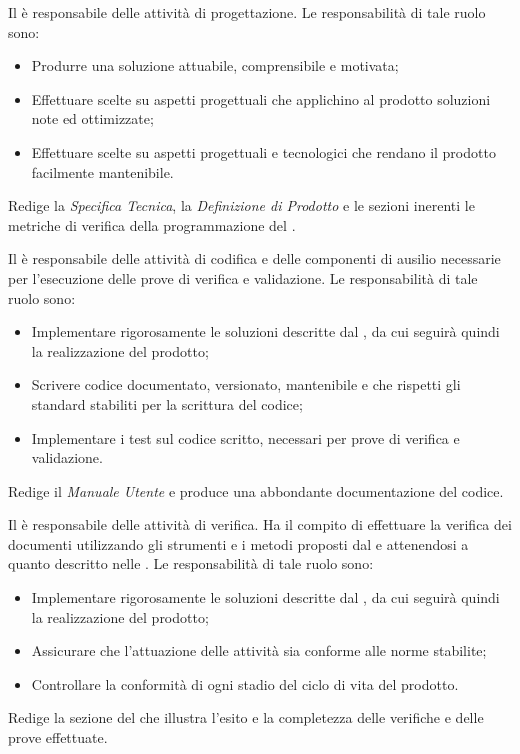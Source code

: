 \documentclass[12pt,a4paper]{article}
\begin{document}
Il \PG{} è responsabile delle attività di progettazione. Le responsabilità di tale
ruolo sono:
\begin{itemize}
  \item Produrre una soluzione attuabile, comprensibile e motivata;
  \item Effettuare scelte su aspetti progettuali che applichino al prodotto soluzioni note ed ottimizzate;
  \item Effettuare scelte su aspetti progettuali e tecnologici che rendano il prodotto facilmente mantenibile.
\end{itemize}
Redige la \textit{Specifica Tecnica}, la \textit{Definizione di Prodotto} e le sezioni inerenti le metriche di verifica della programmazione del \PdQ{}.

Il \PR{} è responsabile delle attività di codifica e delle componenti di ausilio necessarie per l'esecuzione delle prove di verifica e validazione. Le responsabilità di tale ruolo sono:
\begin{itemize}
  \item Implementare rigorosamente le soluzioni descritte dal \PG{}, da cui seguirà quindi la realizzazione del prodotto;
  \item Scrivere codice documentato, versionato, mantenibile e che rispetti gli standard stabiliti per la scrittura del codice;
  \item Implementare i test sul codice scritto, necessari per prove di verifica e validazione.
\end{itemize}
Redige il \textit{Manuale Utente} e produce una abbondante documentazione del codice.

Il \VR{} è responsabile delle attività di verifica. Ha il compito di effettuare la verifica dei documenti utilizzando gli strumenti e i metodi proposti dal \PdQ{} e attenendosi a quanto descritto nelle \NdP{}. 
Le responsabilità di tale ruolo sono:
\begin{itemize}
  \item Implementare rigorosamente le soluzioni descritte dal \PG{}, da cui seguirà quindi la realizzazione del prodotto;
  \item Assicurare che l'attuazione delle attività sia conforme alle norme stabilite;
  \item Controllare la conformità di ogni stadio del ciclo di vita del prodotto.
\end{itemize}
Redige la sezione del \PdQ{} che illustra l'esito e la completezza delle verifiche
e delle prove effettuate.
\end{document}
